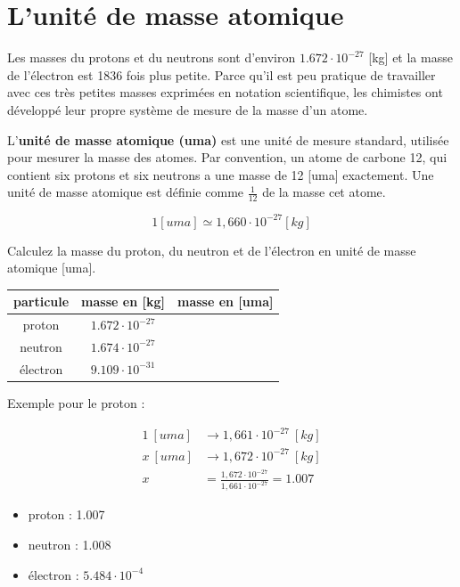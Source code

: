 \documentclass[
  11pt,
  a4paper,
  openany]{book}
\providecommand{\tightlist}{%
  \setlength{\itemsep}{0pt}\setlength{\parskip}{0pt}}
\begin{document}
\section{L'unité de masse atomique}\label{lunituxe9-de-masse-atomique}

Les masses du protons et du neutrons sont d'environ \(1.672\cdot10^{-27}\) {[}kg{]} et la masse de l'électron est 1836 fois plus petite. Parce qu'il est peu pratique de travailler avec ces très petites masses exprimées en notation scientifique, les chimistes ont développé leur propre système de mesure de la masse d'un atome.

L'\textbf{unité de masse atomique (uma)} est une unité de mesure standard, utilisée pour mesurer la masse des atomes. Par convention, un atome de carbone 12, qui contient six protons et six neutrons a une masse de 12 {[}uma{]} exactement. Une unité de masse atomique est définie comme \(\frac{1}{12}\) de la masse cet atome.

\[ 1 [uma] \simeq 1,660 \cdot 10^{-27} [kg] \]

\begin{Exercise}
Calculez la masse du proton, du neutron et de l'électron en unité de masse atomique {[}uma{]}.

\end{Exercise}

\begin{longtable}[]{@{}ccc@{}}
\toprule\noalign{}
particule & masse en {[}kg{]} & masse en {[}uma{]} \\
\midrule\noalign{}
\endhead
\bottomrule\noalign{}
\endlastfoot
proton & \(1.672\cdot10^{-27}\) & \\
neutron & \(1.674\cdot10^{-27}\) & \\
électron & \(9.109\cdot10^{-31}\) & \\
\end{longtable}


\begin{Answer}

Exemple pour le proton :

\[ \begin{split}
  1~[uma] &\rightarrow 1,661\cdot10^{-27}~[kg] \\
  x~[uma] &\rightarrow 1,672\cdot10^{-27}~[kg] \\
  x &= \frac{1,672\cdot10^{-27}}{1,661\cdot10^{-27}} = 1.007
  \end{split} \]

\begin{itemize}
\tightlist
\item
  proton : 1.007
\item
  neutron : 1.008
\item
  électron : \(5.484\cdot10^{-4}\)
\end{itemize}

\end{Answer}
\end{document}
